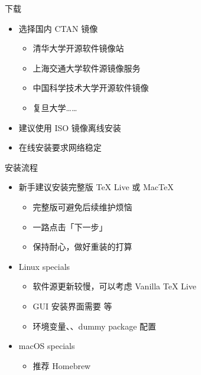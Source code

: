 \begin{frame}{下载}
\begin{itemize}
  \item 选择国内 CTAN 镜像

    \begin{itemize}
      \item 清华大学开源软件镜像站 
      \item 上海交通大学软件源镜像服务 
      \item 中国科学技术大学开源软件镜像  \pause
      \item 复旦大学……
    \end{itemize} \pause

  \item 建议使用 ISO 镜像离线安装
  \item 在线安装要求网络稳定
\end{itemize}
\end{frame}

\begin{frame}{安装流程}
\begin{itemize}
  \item 新手建议安装完整版 \TeX{} Live 或 Mac\TeX{}

    \begin{itemize}
      \item 完整版可避免后续维护烦恼
      \item 一路点击「下一步」
      \item 保持耐心，做好重装的打算
    \end{itemize} \pause

  \item Linux specials

    \begin{itemize}
      \item 软件源更新较慢，可以考虑 Vanilla \TeX{} Live
      \item GUI 安装界面需要  等
      \item 环境变量、、dummy package 配置
    \end{itemize}

  \item macOS specials

    \begin{itemize}
      \item 推荐 Homebrew \href{https://brew.sh/}{\faBeer}
    \end{itemize}
\end{itemize}
\end{frame}


